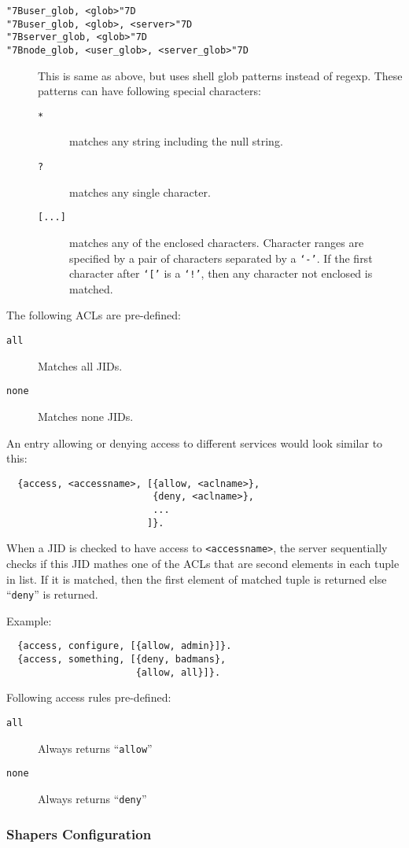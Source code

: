 \documentclass[a4paper,10pt]{article}
\newcommand{\bracehack}{\def\{{\char"7B}\def\}{\char"7D}}
\newcommand{\term}[1]{\texttt{#1}}
\newcommand{\titem}[1]{\item[\bracehack\texttt{#1}]}
\begin{document}
\begin{description}
\titem{\{user\_glob, <glob>\}}
\titem{\{user\_glob, <glob>, <server>\}}
\titem{\{server\_glob, <glob>\}}
\titem{\{node\_glob, <user\_glob>, <server\_glob>\}} This is same as
  above, but uses shell glob patterns instead of regexp.  These patterns can
  have following special characters:
  \begin{description}
  \titem{*} matches any string including the null string.
  \titem{?} matches any single character.
  \titem{[...]} matches any of the enclosed characters.  Character
    ranges are specified by a pair of characters separated by a \term{`-'}.
    If the first character after \term{`['} is a \term{`!'}, then any
    character not enclosed is matched.
  \end{description}
\end{description}

The following ACLs are pre-defined:
\begin{description}
\titem{all} Matches all JIDs.
\titem{none} Matches none JIDs.
\end{description}

An entry allowing or denying access to different services would look similar to
this:
\begin{verbatim}
  {access, <accessname>, [{allow, <aclname>},
                          {deny, <aclname>},
                          ...
                         ]}.
\end{verbatim}
When a JID is checked to have access to \term{<accessname>}, the server
sequentially checks if this JID mathes one of the ACLs that are second elements
in each tuple in list.  If it is matched, then the first element of matched
tuple is returned else ``\term{deny}'' is returned.

Example:
\begin{verbatim}
  {access, configure, [{allow, admin}]}.
  {access, something, [{deny, badmans},
                       {allow, all}]}.
\end{verbatim}

Following access rules pre-defined:
\begin{description}
\titem{all} Always returns ``\term{allow}''
\titem{none} Always returns ``\term{deny}''
\end{description}


\subsubsection{Shapers Configuration}
\label{sec:configshaper}
\end{document}
